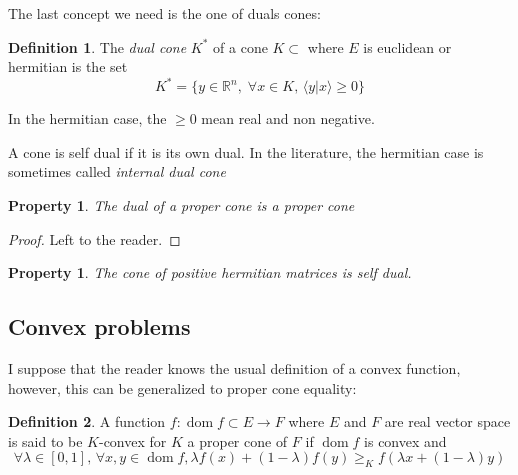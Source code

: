 \documentclass[10pt,a4paper]{report}
\theoremstyle{plain}
\newtheorem{prop}[thm]{Property}
\theoremstyle{definition}
\newtheorem{defn}{Definition}[chapter]
\theoremstyle{remark}
\newcommand{\R}{\ensuremath{\mathbb{R}}}
\newcommand{\TODO}{\textbf{TODO}}
\newcommand{\braket}[2]{\langle#1|#2\rangle}
\renewcommand{\geq}{\geqslant}
\DeclareMathOperator{\dom}{dom}
\begin{document}
The last concept we need is the one of duals cones:

\begin{defn}
  The \emph{dual cone} $K^*$ of a cone $K \subset$ where $E$ is euclidean or hermitian is the set
  \[ K^* = \{y \in \R^n,\; \forall x \in K,\, \braket y x \geq 0\}\]

  In the hermitian case, the $\geq 0$ mean real and non negative.
\end{defn}

A cone is self dual if it is its own dual. In the literature, the hermitian case
is sometimes called \emph{internal dual cone}

\begin{prop}
  The dual of a proper cone is a proper cone
\end{prop}

\begin{proof}
  Left to the reader.
\end{proof}

\begin{prop}
  The cone of positive hermitian matrices is self dual.
\end{prop}





\subsection{Convex problems}

I suppose that the reader knows the usual definition of a convex function,
however, this can be generalized to proper cone equality:

\begin{defn}
  A function $f : \dom f \subset E \to F$ where $E$ and $F$ are real vector
  space is said to be $K$-convex for $K$ a proper cone of $F$ if $\dom f$ is
  convex and
  \[\forall \lambda \in [0,1],\, \forall x,y \in \dom f, \lambda f(x) + (1 -
    \lambda)f(y) \geq_K f(\lambda x + (1-\lambda)y)\]
\end{defn}
\end{document}
